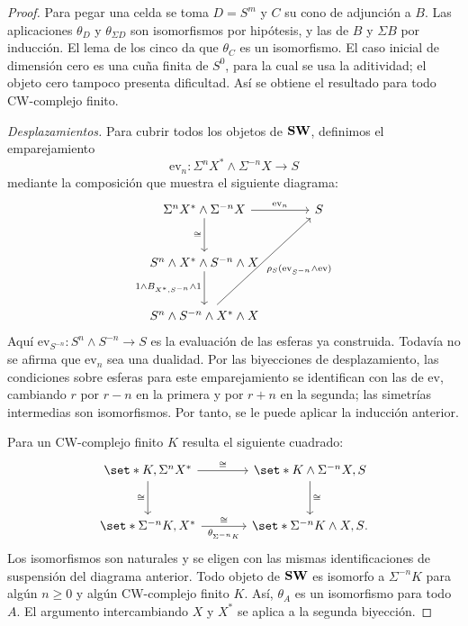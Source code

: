 \begin{proof}
Para pegar una celda se toma $D=S^m$ y $C$ su cono de adjunción a $B$. Las aplicaciones $\theta_D$ y $\theta_{\Sigma D}$ son isomorfismos por hipótesis, y las de $B$ y $\Sigma B$ por inducción. El lema de los cinco da que $\theta_C$ es un isomorfismo. El caso inicial de dimensión cero es una cuña finita de $S^0$, para la cual se usa la aditividad; el objeto cero tampoco presenta dificultad. Así se obtiene el resultado para todo CW-complejo finito.

\emph{Desplazamientos.}
Para cubrir todos los objetos de $\mathbf{SW}$, definimos el emparejamiento
\[
\mathrm{ev}_n\colon\Sigma^nX^*\wedge\Sigma^{-n}X\to S
\]
mediante la composición que muestra el siguiente diagrama:
\[
\begin{tikzcd}[column sep=large,row sep=large]
\Sigma^nX^*\wedge\Sigma^{-n}X
 \arrow[d,"{\cong}"'] \arrow[r,"{\mathrm{ev}_n}"]&S\\
S^n\wedge X^*\wedge S^{-n}\wedge X
 \arrow[d,"{1\wedge B_{X^*,S^{-n}}\wedge1}"']&\\
S^n\wedge S^{-n}\wedge X^*\wedge X
 \arrow[uur,"{{\rho_S(\mathrm{ev}_{S^{-n}}\wedge\mathrm{ev})}}"']&
\end{tikzcd}
\]
Aquí $\mathrm{ev}_{S^{-n}}\colon S^n\wedge S^{-n}\to S$ es la evaluación de las esferas ya construida. Todavía no se afirma que $\mathrm{ev}_n$ sea una dualidad. Por las biyecciones de desplazamiento, las condiciones sobre esferas para este emparejamiento se identifican con las de $\mathrm{ev}$, cambiando $r$ por $r-n$ en la primera y por $r+n$ en la segunda; las simetrías intermedias son isomorfismos. Por tanto, se le puede aplicar la inducción anterior.

Para un CW-complejo finito $K$ resulta el siguiente cuadrado:
\[
\begin{tikzcd}[column sep=large,row sep=large]
\set*{K,\Sigma^nX^*} \arrow[r,"{\cong}"]\arrow[d,"{\cong}"']
 &\set*{K\wedge\Sigma^{-n}X,S}\arrow[d,"{\cong}"]\\
\set*{\Sigma^{-n}K,X^*}\arrow[r,"{\theta_{\Sigma^{-n}K}}"',"{\cong}"]
 &\set*{\Sigma^{-n}K\wedge X,S}.
\end{tikzcd}
\]
Los isomorfismos son naturales y se eligen con las mismas identificaciones de suspensión del diagrama anterior. Todo objeto de $\mathbf{SW}$ es isomorfo a $\Sigma^{-n}K$ para algún $n\geq0$ y algún CW-complejo finito $K$. Así, $\theta_A$ es un isomorfismo para todo $A$. El argumento intercambiando $X$ y $X^*$ se aplica a la segunda biyección.


\end{proof}
